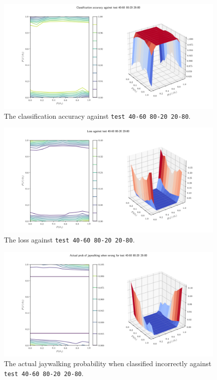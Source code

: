 \documentclass[]{report}
\newcommand{\code}{\texttt}
\begin{document}
% 
% 

\begin{figure}[h]
    \centering
    \centerline{\includegraphics[scale=0.55]{test_40-60_80-20_20-80_accuracy.png}}
    \caption[]{The classification accuracy against \code{test 40-60 80-20 20-80}.}
    \label{fig:test_40-60_80-20_20-80_accuracy_plot}
\end{figure}

\begin{figure}[h]
    \centering
    \centerline{\includegraphics[scale=0.55]{test_40-60_80-20_20-80_loss.png}}
    \caption[]{The loss against \code{test 40-60 80-20 20-80}.}
    \label{fig:test_40-60_80-20_20-80_loss_plot}
\end{figure}

\begin{figure}[h]
    \centering
    \centerline{\includegraphics[scale=0.55]{test_40-60_80-20_20-80_jay_prob.png}}
    \caption[]{The actual jaywalking probability when classified incorrectly against \code{test 40-60 80-20 20-80}.}
    \label{fig:test_40-60_80-20_20-80_jay_prob_plot}
\end{figure}
\end{document}
